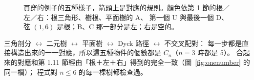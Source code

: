 \begin{figure}[H]
\centering
\FigMeightChain
\caption{貫穿的例子的五種樣子，箭頭上是對應的規則。顏色依第 1 節的根／左／右：根三角形、樹根、平面樹的 A、
第一個 U 與最後一個 D、弦 $(1,6)$ 是\textcolor{cTop}{根}；B、C 那一部分是\textcolor{cLeft}{左}；右是空的。}
\label{fig:m08-chain}
\end{figure}

\begin{keybox}[一條鏈]
三角剖分 $\leftrightarrow$ 二元樹 $\leftrightarrow$ 平面樹 $\leftrightarrow$ Dyck 路徑 $\leftrightarrow$ 不交叉配對：
每一步都是直接構造出來的一一對應，所以這五種物件的個數都是 $C_n$（$n=3$ 時都是 5）。
合起來的對應和第 1.11 節經由「根＋左＋右」得到的完全一致（圖~\ref{fig:onenumber} 的同一欄）；
程式對 $n\le6$ 的每一棵樹都檢查過。
\end{keybox}
